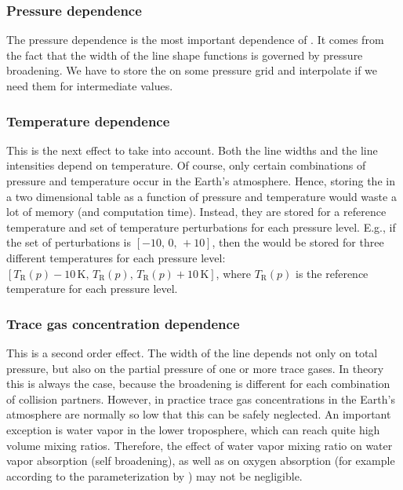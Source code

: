 \subsubsection{Pressure dependence}

The pressure dependence is the most important dependence of
\AbsXsec. It comes from the fact that the width of the line shape
functions is governed by pressure broadening. We have to store the
 on some pressure grid and interpolate if we need them for
intermediate values.

\subsubsection{Temperature dependence}

This is the next effect to take into account. Both the line widths and
the line intensities depend on temperature. Of course, only certain
combinations of pressure and temperature occur in the Earth's
atmosphere. Hence, storing the  in a two dimensional table
as a function of pressure and temperature would waste a lot of memory (and
computation time).
Instead, they are stored for a reference temperature and set of
temperature perturbations for each pressure level. E.g., if the set of
perturbations is $[-10,\, 0,\, +10]$, then the  would be stored
for three different temperatures for each pressure level:
$[T_\mathrm{R}(p)-10\,\mbox{K},\, T_\mathrm{R}(p),\, T_\mathrm{R}(p)+10\,\mbox{K}]$, where
$T_\mathrm{R}(p)$ is the reference temperature for each pressure level.

\subsubsection{Trace gas concentration dependence}

This is a second order effect. The width of the line depends not only
on total pressure, but also on the partial pressure of one or more
trace gases. In theory this is always the case, because the broadening
is different for each combination of collision partners. However, in
practice trace gas concentrations in the Earth's atmosphere are
normally so low that this can be safely neglected. An important
exception is water vapor in the lower troposphere, which can reach
quite high volume mixing ratios. Therefore, the effect of water vapor
mixing ratio on water vapor absorption (self broadening), as well as
on oxygen absorption (for example according to the parameterization by
\citet{pwr:93}) may not be negligible.

